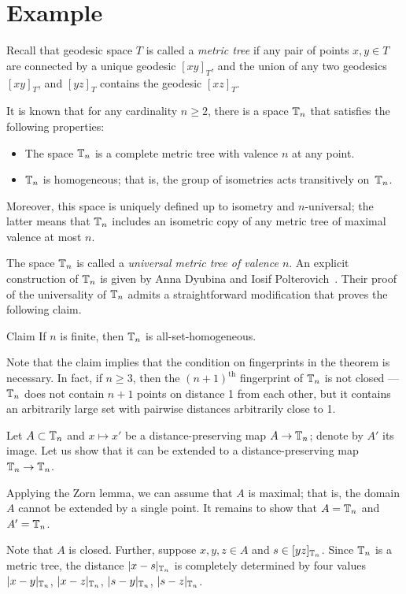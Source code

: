 \documentclass[a4paper,10pt]{article}
\begin{document}
\section{Example}

Recall that geodesic space $T$ is called a \emph{metric tree} if any pair of points $x,y\in T$ are connected by a unique geodesic $[xy]_T$,
and the union of any two geodesics $[xy]_T$, and $[yz]_T$ contains the geodesic $[xz]_T$.

It is known that for any cardinality $n\ge 2$, there is a space $\mathbb{T}_n$ that satisfies the following properties:
\begin{itemize}
\item The space $\mathbb{T}_n$ is a complete metric tree with valence $n$ at any point.
\item $\mathbb{T}_n$ is homogeneous; that is, the group of isometries acts transitively on~$\mathbb{T}_n$. 
\end{itemize}
Moreover, this space is uniquely defined up to isometry and $n$-universal; the latter means that $\mathbb{T}_n$ includes an isometric copy of any metric tree of maximal valence at most $n$.

The space $\mathbb{T}_n$ is called
a \emph{universal metric tree of valence $n$}.
An explicit construction of $\mathbb{T}_n$ is given by Anna Dyubina and Iosif Polterovich~\cite{dyubina-polterovich}.
Their proof of the universality of $\mathbb{T}_n$ admits a straightforward modification that proves the following claim. 

\begin{thm}{Claim}
If $n$ is finite, then $\mathbb{T}_n$ is all-set-homogeneous.
\end{thm}

Note that the claim implies that the condition on fingerprints in the theorem is necessary.
In fact, if $n\ge 3$, then the $(n+1)^{\text{th}}$ fingerprint of $\mathbb{T}_n$ is not closed --- $\mathbb{T}_n$ does not contain $n+1$ points on distance 1 from each other,
but it contains an arbitrarily large set with pairwise distances arbitrarily close to 1.


Let $A\subset \mathbb{T}_n$ and $x\mapsto x'$ be a distance-preserving map $A\to \mathbb{T}_n$;
denote by $A'$ its image.
Let us show that it can be extended to a distance-preserving map $\mathbb{T}_n\to \mathbb{T}_n$.

Applying the Zorn lemma, we can assume that $A$ is maximal; that is, the domain $A$ cannot be extended by a single point.
It remains to show that $A=\mathbb{T}_n$ and $A'=\mathbb{T}_n$.

Note that $A$ is closed.
Further, suppose $x,y,z\in A$ and $s\in [yz]_{\mathbb{T}_n}$.
Since $\mathbb{T}_n$ is a metric tree, the distance $|x-s|_{\mathbb{T}_n}$ is completely determined by four values $|x-y|_{\mathbb{T}_n}$, $|x-z|_{\mathbb{T}_n}$, $|s-y|_{\mathbb{T}_n}$, $|s-z|_{\mathbb{T}_n}$.
\end{document}
